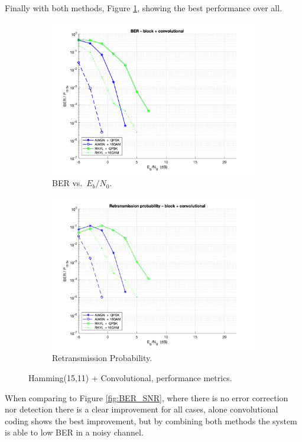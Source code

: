 Finally with both methods, Figure \ref{fig:Both_BER}, showing the best performance over all.

\begin{figure}[H]

    \centering
    \begin{subfigure}{0.45\textwidth}
        \includegraphics*[scale = 0.18]{Images/BlockConvCodeBER.png}
        \caption{BER vs.\ $E_b/N_0$.}
        \label{fig:Both_BER}
    \end{subfigure}
    \begin{subfigure}{0.45\textwidth}
        \includegraphics*[scale = 0.19]{Images/BlockConvCodeRTX.png}
        \caption{Retransmission Probability.}
        \label{fig:Pret_Both_Sim}
    \end{subfigure}
    
    \caption{Hamming(15,11) + Convolutional, performance metrics.}
    \label{fig:Both_performance}
\end{figure}

When comparing to Figure \ref{fig:BER_SNR}, where there is no error correction nor detection there is a clear improvement for all cases, alone convolutional coding shows the best improvement, but by combining both methods the system is able to low BER in a noisy channel.